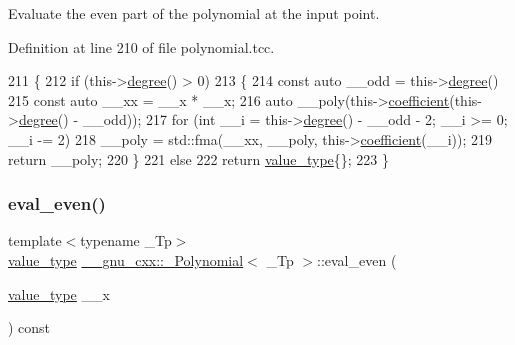 Evaluate the even part of the polynomial at the input point. 

Definition at line 210 of file polynomial.\+tcc.


\begin{DoxyCode}
211     \{
212       \textcolor{keywordflow}{if} (this->\hyperlink{class____gnu__cxx_1_1__Polynomial_a07d9933aeeb9afbd823218ed921336cb}{degree}() > 0)
213         \{
214           \textcolor{keyword}{const} \textcolor{keyword}{auto} \_\_odd = this->\hyperlink{class____gnu__cxx_1_1__Polynomial_a07d9933aeeb9afbd823218ed921336cb}{degree}() %
215           \textcolor{keyword}{const} \textcolor{keyword}{auto} \_\_xx = \_\_x * \_\_x;
216           \textcolor{keyword}{auto} \_\_poly(this->\hyperlink{class____gnu__cxx_1_1__Polynomial_a7cee31b3acbe8c024af6d696bc610f49}{coefficient}(this->\hyperlink{class____gnu__cxx_1_1__Polynomial_a07d9933aeeb9afbd823218ed921336cb}{degree}() - \_\_odd));
217           \textcolor{keywordflow}{for} (\textcolor{keywordtype}{int} \_\_i = this->\hyperlink{class____gnu__cxx_1_1__Polynomial_a07d9933aeeb9afbd823218ed921336cb}{degree}() - \_\_odd - 2; \_\_i >= 0; \_\_i -= 2)
218             \_\_poly = std::fma(\_\_xx, \_\_poly, this->\hyperlink{class____gnu__cxx_1_1__Polynomial_a7cee31b3acbe8c024af6d696bc610f49}{coefficient}(\_\_i));
219           \textcolor{keywordflow}{return} \_\_poly;
220         \}
221       \textcolor{keywordflow}{else}
222         \textcolor{keywordflow}{return} \hyperlink{class____gnu__cxx_1_1__Polynomial_a725563351f50e76084a7a016c06f8a53}{value\_type}\{\};
223     \}
\end{DoxyCode}
\mbox{\label{class____gnu__cxx_1_1__Polynomial_ac70ecc3968e15077ef2d68390d150f5a}} 
\subsubsection{\texorpdfstring{eval\+\_\+even()}{eval\_even()}\hspace{0.1cm}{\footnotesize\ttfamily [2/3]}}
{\footnotesize\ttfamily template$<$typename \+\_\+\+Tp$>$ \\
\hyperlink{class____gnu__cxx_1_1__Polynomial_a725563351f50e76084a7a016c06f8a53}{value\+\_\+type} \hyperlink{class____gnu__cxx_1_1__Polynomial}{\+\_\+\+\_\+gnu\+\_\+cxx\+::\+\_\+\+Polynomial}$<$ \+\_\+\+Tp $>$\+::eval\+\_\+even (\begin{DoxyParamCaption}\item[{\hyperlink{class____gnu__cxx_1_1__Polynomial_a725563351f50e76084a7a016c06f8a53}{value\+\_\+type}}]{\+\_\+\+\_\+x }\end{DoxyParamCaption}) const}

